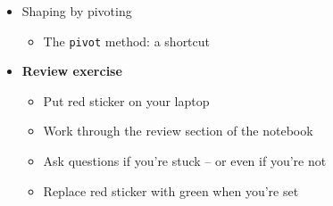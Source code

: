 \documentclass[11pt]{article}
\begin{document}
\begin{itemize}
\item Shaping by pivoting
\begin{itemize}
\item The {\tt pivot} method:  a shortcut
\end{itemize}

\item {\bf Review exercise}
\begin{itemize}
\item Put red sticker on your laptop
\item Work through the review section of the notebook
\item Ask questions if you're stuck -- or even if you're not
\item Replace red sticker with green when you're set
\end{itemize}


\end{itemize}



\begin{comment}
\section*{After class}

\begin{itemize}
\item Required
\begin{itemize}
\item Continue to work on your project ideas
\end{itemize}
\item Recommended
\begin{itemize}
\item Skim Project Guide
\item Skim Project Examples
\item Bounce around project ideas with friends
\end{itemize}
\end{itemize}
\end{comment}


\end{document}
